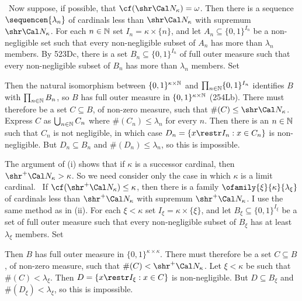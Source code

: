 {\medskip

 \Quer\ Now suppose, if possible, that
$\cf(\shr\Cal N_{\kappa})=\omega$.
Then there is a sequence $\sequencen{\lambda_n}$ of cardinals
less than $\shr\Cal N_{\kappa}$ with supremum $\shr\Cal N_{\kappa}$.
For each $n\in\Bbb N$ set $I_n=\kappa\times\{n\}$, and let
$A_n\subseteq\{0,1\}^{I_n}$ be a
non-negligible set such that every non-negligible
subset of $A_n$ has more than $\lambda_n$ members.
By 523Dc, there is a set $B_n\subseteq\{0,1\}^{I_n}$ of full outer
measure such that every non-negligible
subset of $B_n$ has more than $\lambda_n$ members.   Set


\noindent Then the natural isomorphism between
$\{0,1\}^{\kappa\times\Bbb N}$ and $\prod_{n\in\Bbb N}\{0,1\}^{I_n}$
identifies $B$ with $\prod_{n\in\Bbb N}B_n$, so $B$ has full outer
measure in $\{0,1\}^{\kappa\times\Bbb N}$ (254Lb).   There must therefore
be a set $C\subseteq B$, of non-zero measure, such that
$\#(C)\le\shr\Cal N_{\kappa}$.   Express $C$ as
$\bigcup_{n\in\Bbb N}C_n$ where $\#(C_n)\le\lambda_n$ for every
$n$.   Then there is an $n\in\Bbb N$ such that $C_n$ is not negligible,
in which case $D_n=\{x\restr I_n:x\in C_n\}$ is non-negligible.   But
$D_n\subseteq B_n$ and $\#(D_n)\le\lambda_n$, so this is impossible.\ \Bang

\medskip

 The argument of (i) shows that if $\kappa$ is a successor
cardinal, then $\shr^+\Cal N_{\kappa}>\kappa$.   So we need consider only
the case in which $\kappa$ is a limit cardinal.
\Quer\ If $\cf(\shr^+\Cal N_{\kappa})\le\kappa$, then
there is a family $\ofamily{\xi}{\kappa}{\lambda_{\xi}}$ of cardinals
less than $\shr^+\Cal N_{\kappa}$ with supremum $\shr^+\Cal N_{\kappa}$.
I use the same method as in (ii).
For each $\xi<\kappa$ set $I_{\xi}=\kappa\times\{\xi\}$, and let
$B_{\xi}\subseteq\{0,1\}^{I_{\xi}}$ be a
set of full outer measure such that every non-negligible
subset of $B_{\xi}$ has at least $\lambda_{\xi}$ members.  Set


\noindent Then $B$ has full outer
measure in $\{0,1\}^{\kappa\times\kappa}$.   There must therefore
be a set $C\subseteq B$, of non-zero measure, such that
$\#(C)<\shr^+\Cal N_{\kappa}$.   Let $\xi<\kappa$ be such that
$\#(C)<\lambda_{\xi}$.   Then
$D=\{x\restr I_{\xi}:x\in C\}$ is non-negligible.   But
$D\subseteq B_{\xi}$ and $\#(D_{\xi})<\lambda_{\xi}$, so this is
impossible.\ \Bang

}%

